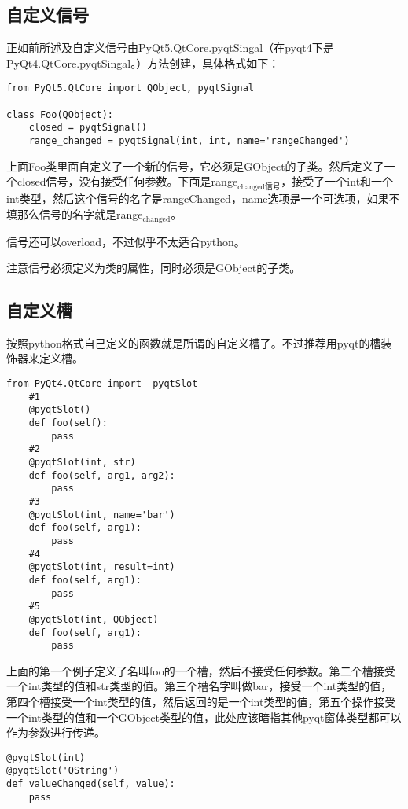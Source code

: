 \documentclass[11pt,oneside]{article}
\begin{document}
\subsection{自定义信号}
\label{sec:orgheadline18}
正如前所述及自定义信号由PyQt5.QtCore.pyqtSingal（在pyqt4下是PyQt4.QtCore.pyqtSingal。）方法创建，具体格式如下：
\begin{verbatim}
from PyQt5.QtCore import QObject, pyqtSignal

class Foo(QObject):
    closed = pyqtSignal()
    range_changed = pyqtSignal(int, int, name='rangeChanged')
\end{verbatim}

上面Foo类里面自定义了一个新的信号，它必须是GObject的子类。然后定义了一个closed信号，没有接受任何参数。下面是range\(_{\text{changed信号}}\)，接受了一个int和一个int类型，然后这个信号的名字是rangeChanged，name选项是一个可选项，如果不填那么信号的名字就是range\(_{\text{changed}}\)。

信号还可以overload，不过似乎不太适合python。

注意信号必须定义为类的属性，同时必须是GObject的子类。


\subsection{自定义槽}
\label{sec:orgheadline19}
按照python格式自己定义的函数就是所谓的自定义槽了。不过推荐用pyqt的槽装饰器来定义槽。

\begin{verbatim}
from PyQt4.QtCore import  pyqtSlot
    #1
    @pyqtSlot()
    def foo(self):
        pass
    #2
    @pyqtSlot(int, str)
    def foo(self, arg1, arg2):
        pass
    #3
    @pyqtSlot(int, name='bar')
    def foo(self, arg1):
        pass
    #4
    @pyqtSlot(int, result=int)
    def foo(self, arg1):
        pass
    #5
    @pyqtSlot(int, QObject)
    def foo(self, arg1):
        pass
\end{verbatim}

上面的第一个例子定义了名叫foo的一个槽，然后不接受任何参数。第二个槽接受一个int类型的值和str类型的值。第三个槽名字叫做bar，接受一个int类型的值，第四个槽接受一个int类型的值，然后返回的是一个int类型的值，第五个操作接受一个int类型的值和一个GObject类型的值，此处应该暗指其他pyqt窗体类型都可以作为参数进行传递。

\begin{verbatim}
@pyqtSlot(int)
@pyqtSlot('QString')
def valueChanged(self, value):
    pass
\end{verbatim}
\end{document}
